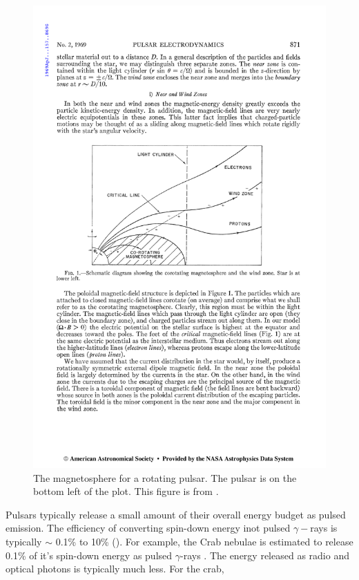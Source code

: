 \begin{figure}[htpb]
  \begin{center}
    \includegraphics{chapters/pulsar_pwn_system/figures/pulsar_magnetosphere.pdf}
  \end{center}
  \caption{The magnetosphere for a rotating pulsar.
  The pulsar is on the bottom left of the plot. This figure is
  from \cite{goldreich_1969_pulsar-electrodynamics}.}
\end{figure}



Pulsars typically release a small amount of their overall energy
budget as pulsed emission. The efficiency of converting
spin-down energy inot pulsed $\gamma-$rays is typically
$\sim$ 0.1\% to 10\% (\cite{abdo_2010a_first-fermi}).
For example, the Crab nebulae is estimated to release 0.1\%
of it's spin-down energy as pulsed $\gamma$-rays \cite{abdo_2010a_fermi-large}.
The energy released as radio and optical photons is typically much less.
For the crab,

